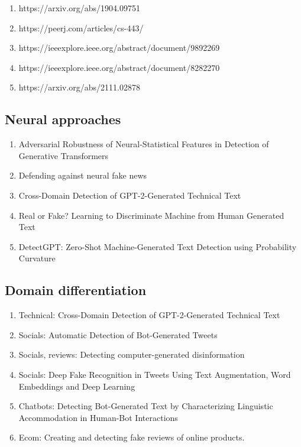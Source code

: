 \begin{enumerate}
    \item https://arxiv.org/abs/1904.09751
    \item https://peerj.com/articles/cs-443/
    \item https://ieeexplore.ieee.org/abstract/document/9892269
    \item https://ieeexplore.ieee.org/abstract/document/8282270
    \item https://arxiv.org/abs/2111.02878
\end{enumerate}

\subsection{Neural approaches}

\begin{enumerate}
    \item Adversarial Robustness of Neural-Statistical Features in Detection of Generative Transformers
    \item Defending against neural fake news
    \item Cross-Domain Detection of GPT-2-Generated Technical Text
    \item Real or Fake? Learning to Discriminate Machine from Human Generated Text
    \item DetectGPT: Zero-Shot Machine-Generated Text Detection using Probability Curvature
\end{enumerate}


\subsection{Domain differentiation}

\begin{enumerate}
    \item Technical: Cross-Domain Detection of GPT-2-Generated Technical Text
    \item Socials:  Automatic Detection of Bot-Generated Tweets
    \item Socials, reviews: Detecting computer-generated disinformation
    \item Socials: Deep Fake Recognition in Tweets Using Text Augmentation, Word Embeddings and Deep Learning
    \item Chatbots:  Detecting Bot-Generated Text by Characterizing Linguistic Accommodation in Human-Bot Interactions
    \item Ecom: Creating and detecting fake reviews of online products.
\end{enumerate}